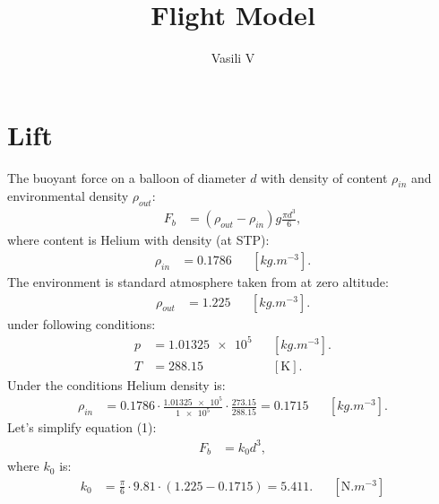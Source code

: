 \documentclass{article}
\begin{document}
\title{Flight Model}
\author{Vasili V}
\renewcommand{\today}{November 22, 2018}
\maketitle
\section{Lift}
The buoyant force on a balloon of diameter $d$ with density of content $\rho_{in}$ and environmental density $\rho_{out}$:
\begin{equation}
\begin{aligned}
F_b &= (\rho_{out} - \rho_{in})g\frac{\pi{d}^3}{6},
\end{aligned}
\end{equation}
where content is Helium with density (at STP):
\begin{equation}
\begin{aligned}
\rho_{in} &= 0.1786 && [\si{kg.m^{-3}}].
\end{aligned}
\end{equation}
The environment is standard atmosphere taken from \cite{NASA76} at zero altitude:
\begin{equation}
\begin{aligned}
\rho_{out} &= 1.225 && [\si{kg.m^{-3}}].
\end{aligned}
\end{equation}
under following conditions:
\begin{equation}
\begin{aligned}
p &= \num{1.01325e5} && [\si{kg.m^{-3}}]. \\
T &= \num{288.15} && [\si{\kelvin}].
\end{aligned}
\end{equation}
Under the conditions Helium density is:
\begin{equation}
\begin{aligned}
\rho_{in} &= 0.1786\cdot\frac{\num{1.01325e5}}{\num{1e5}}\cdot\frac{\num{273.15}}{\num{288.15}} = 0.1715 && [\si{kg.m^{-3}}].
\end{aligned}
\end{equation}
Let's simplify equation (1):
\begin{equation}
\begin{aligned}
F_b &= k_0d^3,
\end{aligned}
\end{equation}
where $k_0$ is:
\begin{equation}
\begin{aligned}
k_0 &= \frac{\pi}{6}\cdot\num{9.81}\cdot(\num{1.225}-\num{0.1715}) = 5.411. && [\si{\newton.m^{-3}}]
\end{aligned}
\end{equation}
\end{document}
